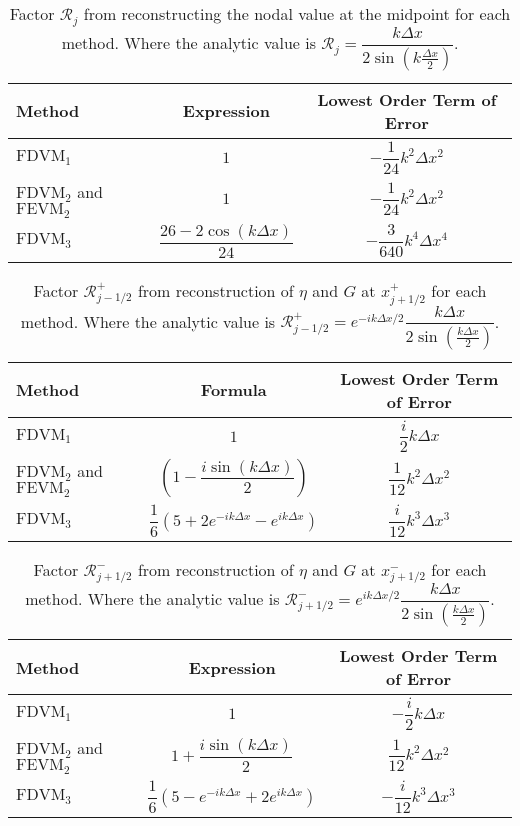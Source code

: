 \begin{table}
	\centering
	\begin{tabular}{l  c  c}
		Method& Expression& Lowest Order Term of Error  \T\B \\
		\hline 
		$\text{FDVM}_1$ & $1$ & $-\dfrac{1}{24}k^2 \Delta x^2$ \T \B \\
		$\text{FDVM}_2$ and $\text{FEVM}_2$& $1$ & $-\dfrac{1}{24}k^2 \Delta x^2$ \T \B \\
		$\text{FDVM}_3$& $\dfrac{26 - 2 \cos\left(k \Delta x\right)}{24}$ & $-\dfrac{3}{640}k^4 \Delta x^4$ \T \B  \\
		\hline	\end{tabular}
	\caption{Factor $\mathcal{R}_j$ from reconstructing the nodal value at the midpoint for each method. Where the analytic value is $\mathcal{R}_j = \dfrac{k\Delta x}{2 \sin \left(k\frac{\Delta x}{2}\right)  }$.}
	\label{tab:Mfactor}
\end{table}
\begin{table}
	\centering
	\begin{tabular}{l  c  c}
		Method & Formula& Lowest Order Term of Error\\
		\hline
		$\text{FDVM}_1$ & $1$ & $\dfrac{i}{2}k \Delta x$ \T\B \\
		$\text{FDVM}_2$ and $\text{FEVM}_2$& $ \left(1 - \dfrac{i \sin\left(k\Delta x \right)}{2} \right)$ & $\dfrac{1}{12}k^2 \Delta x^2$  \T\B\\
		$\text{FDVM}_3$& $\dfrac{1}{6}\left({5 + 2e^{-i k {\Delta x}} - e^{i k {\Delta x}}} \right)$ & $\dfrac{i}{12}k^3 \Delta x^3$  \T\B \\
		\hline
	\end{tabular}
	\caption{Factor $\mathcal{R}^+_{j-1/2}$ from reconstruction of $\eta$ and $G$ at $x^+_{j+1/2}$ for each method. Where the analytic value is $\mathcal{R}^+_{j-1/2} =e^{-i k \Delta x/2}\dfrac{k\Delta x}{2 \sin\left(\frac{k \Delta x}{2}\right)}$. }
	\label{tab:Rpfactor}
\end{table}
\begin{table}
	\centering
	\begin{tabular}{l  c  c}
		Method& Expression& Lowest Order Term of Error  \T\B \\
		\hline
		$\text{FDVM}_1$& $1$ & $-\dfrac{i}{2}k \Delta x$  \T\B \\
		$\text{FDVM}_2$ and $\text{FEVM}_2$& $1 +  \dfrac{i \sin\left(k\Delta x \right)}{2}$ & $\dfrac{1}{12}k^2 \Delta x^2$  \T\B \\
		$\text{FDVM}_3$& $\dfrac{1}{6}\left({5 - e^{-i k {\Delta x}} +2 e^{i k {\Delta x}}} \right)$ & $-\dfrac{i}{12}k^3 \Delta x^3$  \T\B \\
		\hline
	\end{tabular}
	\caption{Factor $\mathcal{R}^-_{j+1/2}$ from reconstruction of $\eta$ and $G$ at $x^-_{j+1/2}$ for each method. Where the analytic value is $\mathcal{R}^-_{j+1/2} =e^{i k \Delta x/2} \dfrac{k\Delta x}{2 \sin\left(\frac{k \Delta x}{2}\right)}$.}
	\label{tab:Rmfactor}
\end{table}
